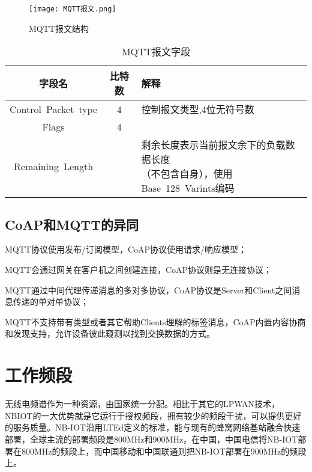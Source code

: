 


\begin{figure}[h]
	\texttt{[image: MQTT报文.png]}
	\caption{MQTT报文结构}
	\label{MQTT报文}
\end{figure}

\begin{table}[h!]
\caption{MQTT报文字段}
\begin{tabular}{ccl}
\toprule
字段名 & 比特数 & 解释\\
\midrule
Control Packet type	&4&控制报文类型,4位无符号数\\
Flags	&4&	\\
Remaining Length&&\makecell[c]{剩余长度表示当前报文余下的负载数据长度\\（不包含自身），使用Base 128 Varints编码}\\
\bottomrule
\end{tabular}
\label{mqtt字段}
\end{table}

\subsection{CoAP和MQTT的异同}


  MQTT协议使用发布/订阅模型，CoAP协议使用请求/响应模型；

  MQTT会通过网关在客户机之间创建连接，CoAP协议则是无连接协议；

  MQTT通过中间代理传递消息的多对多协议，CoAP协议是Server和Client之间消息传递的单对单协议；
  
  MQTT不支持带有类型或者其它帮助Clients理解的标签消息，CoAP内置内容协商和发现支持，允许设备彼此窥测以找到交换数据的方式。


\section{工作频段}
无线电频谱作为一种资源，由国家统一分配。相比于其它的LPWAN技术，NBIOT的一大优势就是它运行于授权频段，拥有较少的频段干扰，可以提供更好的服务质量。NB-IOT沿用LTEd定义的标准，能与现有的蜂窝网络基站融合快速部署，全球主流的部署频段是800MHz和900MHz，在中国，中国电信将NB-IOT部署在800MHz的频段上，而中国移动和中国联通则把NB-IOT部署在900MHz的频段上。


